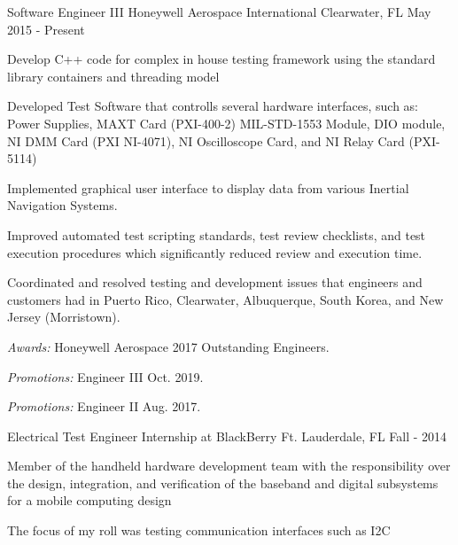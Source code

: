 

\begin{cventries}

  \cventry
    {Software Engineer III} %
    {Honeywell Aerospace International} %
    {Clearwater, FL} %
    {May 2015 - Present} %
    {
      \begin{cvitems} %
        \item {Develop C++ code for complex in house testing framework using the standard library containers and threading model}
				\item {Developed Test Software that controlls several hardware interfaces, such as: Power Supplies, MAXT Card (PXI-400-2) MIL-STD-1553 Module, DIO module, NI DMM Card (PXI NI-4071), NI Oscilloscope Card, and NI Relay Card (PXI-5114)} \item {Implemented graphical user interface to display data from various Inertial Navigation Systems.}
				\item {Improved automated test scripting standards, test review checklists, and test execution procedures which significantly reduced review and execution time.}
				\item {Coordinated and resolved testing and development issues that engineers and customers had in Puerto Rico, Clearwater, Albuquerque, South Korea, and New Jersey (Morristown).}
				\item {{\it Awards:} Honeywell Aerospace 2017 Outstanding Engineers.}
				\item {{\it Promotions:} Engineer III Oct. 2019.}
				\item {{\it Promotions:} Engineer II Aug. 2017.}
      \end{cvitems}
    }

	\cventry
		{Electrical Test Engineer} %
		{Internship at BlackBerry} %
		{Ft. Lauderdale, FL} %
		{Fall - 2014} %
		{
			\begin{cvitems} %
			\item {Member of the handheld hardware development team with the responsibility over the design, integration, and verification of the baseband and digital subsystems for a mobile computing design}
			\item {The focus of my roll was testing communication interfaces such as I2C}
			\end{cvitems}
		}
\end{cventries}
